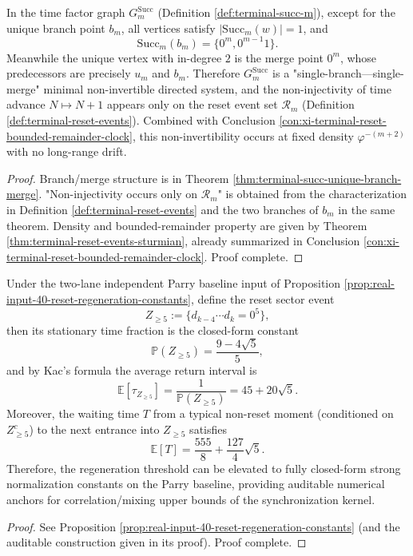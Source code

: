 \begin{conclusion}[Minimal non-invertibility of Zeckendorf time factor graph: one-branch-one-merge \texorpdfstring{$\Rightarrow$}{=>} non-injectivity supported only on \texorpdfstring{$\mathcal R_m$}{R_m}]\label{con:xi-terminal-succ-minimal-noninvertibility}
In the time factor graph \(G^{\mathrm{Succ}}_m\) (Definition \ref{def:terminal-succ-m}), except for the unique branch point \(b_m\), all vertices satisfy \(|\mathrm{Succ}_m(w)|=1\), and
\[
\mathrm{Succ}_m(b_m)=\{0^m,0^{m-1}1\}.
\]
Meanwhile the unique vertex with in-degree \(2\) is the merge point \(0^m\), whose predecessors are precisely \(u_m\) and \(b_m\).
Therefore \(G^{\mathrm{Succ}}_m\) is a "single-branch—single-merge" minimal non-invertible directed system, and the non-injectivity of time advance \(N\mapsto N+1\) appears only on the reset event set \(\mathcal R_m\) (Definition \ref{def:terminal-reset-events}).
Combined with Conclusion \ref{con:xi-terminal-reset-bounded-remainder-clock}, this non-invertibility occurs at fixed density \(\varphi^{-(m+2)}\) with no long-range drift.
\end{conclusion}
\begin{proof}[Proof]
Branch/merge structure is in Theorem \ref{thm:terminal-succ-unique-branch-merge}.
"Non-injectivity occurs only on \(\mathcal R_m\)" is obtained from the characterization in Definition \ref{def:terminal-reset-events} and the two branches of \(b_m\) in the same theorem.
Density and bounded-remainder property are given by Theorem \ref{thm:terminal-reset-events-sturmian}, already summarized in Conclusion \ref{con:xi-terminal-reset-bounded-remainder-clock}. Proof complete.
\end{proof}

\begin{conclusion}\label{con:xi-terminal-parry-reset-sector-constants}
Under the two-lane independent Parry baseline input of Proposition \ref{prop:real-input-40-reset-regeneration-constants}, define the reset sector event
\[
Z_{\ge 5}:=\{d_{k-4}\cdots d_k=0^5\},
\]
then its stationary time fraction is the closed-form constant
\[
\mathbb P(Z_{\ge 5})=\frac{9-4\sqrt5}{5},
\]
and by Kac's formula the average return interval is
\[
\mathbb E[\tau_{Z_{\ge 5}}]=\frac{1}{\mathbb P(Z_{\ge 5})}=45+20\sqrt5.
\]
Moreover, the waiting time \(T\) from a typical non-reset moment (conditioned on \(Z_{\ge 5}^c\)) to the next entrance into \(Z_{\ge 5}\) satisfies
\[
\mathbb E[T]=\frac{555}{8}+\frac{127}{4}\sqrt5.
\]
Therefore, the regeneration threshold can be elevated to fully closed-form strong normalization constants on the Parry baseline, providing auditable numerical anchors for correlation/mixing upper bounds of the synchronization kernel.
\end{conclusion}
\begin{proof}[Proof]
See Proposition \ref{prop:real-input-40-reset-regeneration-constants} (and the auditable construction given in its proof). Proof complete.
\end{proof}

